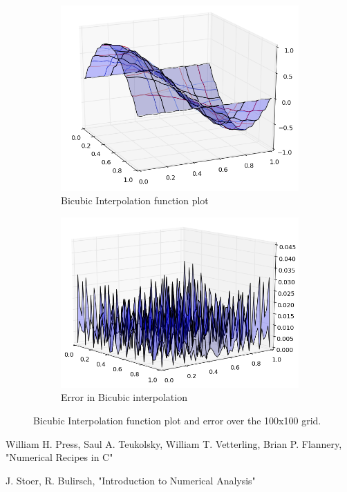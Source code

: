\documentclass[11pt]{article}
\begin{document}
\begin{figure}[h]
        \centering
        \begin{subfigure}{.5\textwidth}
  \centering
        \includegraphics[width=1\linewidth]{q8/cubic_func_10.png}
                \caption{Bicubic Interpolation function plot}
                \label{fig:q8_cubic_func_10}
                \end{subfigure}%
\begin{subfigure}{.5\textwidth}
  \centering
        \includegraphics[width=1\linewidth]{q8/cubic_err_10.png}
                \caption{Error in Bicubic interpolation}
                \label{fig:q8_cubic_err_10}
	\end{subfigure}
            
\caption{Bicubic Interpolation function plot and error over the 100x100 grid.}
\label{fig:q8_cubic_10}        
\end{figure} 


\begin{thebibliography}{155}
William H. Press, Saul A. Teukolsky, William T. Vetterling, Brian P. Flannery, "Numerical Recipes in C" 

J. Stoer, R. Bulirsch, "Introduction to Numerical Analysis"

\end{thebibliography}
\end{document}
